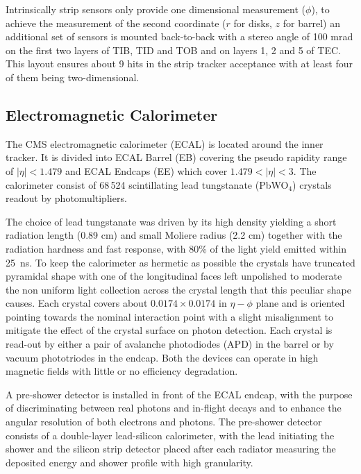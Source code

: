 Intrinsically strip sensors only provide one dimensional measurement ($\phi$), to achieve the measurement of the second coordinate ($r$ for disks, $z$ for barrel) an additional set of sensors is mounted back-to-back with a stereo angle of 100 mrad on the first two layers of TIB, TID and TOB and on layers 1, 2 and 5 of TEC. This layout ensures about 9 hits in the strip tracker acceptance with at least four of them being two-dimensional.


\subsection{Electromagnetic Calorimeter}

The CMS electromagnetic calorimeter (ECAL) is located around the inner tracker. It is divided into ECAL Barrel (EB) covering the pseudo rapidity range of $|\eta| < 1.479$ and ECAL Endcaps (EE) which cover $1.479 < |\eta| < 3$. 
The calorimeter consist of 68\,524 scintillating lead tungstanate (PbWO$_4$) crystals readout by photomultipliers. 

The choice of lead tungstanate was driven by its high density yielding a short radiation length (0.89 cm) and small Moliere radius (2.2 cm) together with the radiation hardness and fast response, with 80\% of the light yield emitted within 25~ns. To keep the calorimeter as hermetic as possible the crystals have truncated pyramidal shape with one of the longitudinal faces left unpolished to moderate the non uniform light collection across the crystal length that this peculiar shape causes. Each crystal covers about $0.0174 \times 0.0174$ in $\eta-\phi$ plane and is oriented pointing towards the nominal interaction point with a slight misalignment to mitigate the effect of the crystal surface on photon detection. Each crystal is read-out by either a pair of avalanche photodiodes (APD) in the barrel or by vacuum phototriodes in the endcap. Both the devices can operate in high magnetic fields with little or no efficiency degradation. 

A pre-shower detector is installed in front of the ECAL endcap, with the purpose of discriminating between real photons and in-flight \piz decays and to enhance the angular resolution of both electrons and photons. The pre-shower detector consists of a double-layer lead-silicon calorimeter, with the lead initiating the shower and the silicon strip detector placed after each radiator measuring the deposited energy and shower profile with high granularity.


